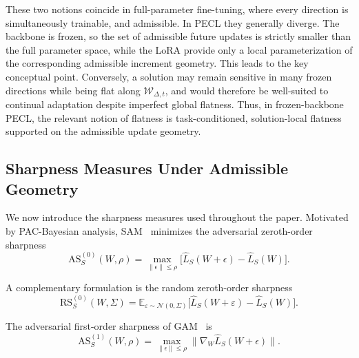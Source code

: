\documentclass[10pt]{article} %
\begin{document}
These two notions coincide in full-parameter fine-tuning, where every direction is simultaneously trainable, and admissible.
In PECL they generally diverge.
The backbone is frozen, so the set of admissible future updates is strictly smaller than the full parameter space, while the LoRA provide only a local parameterization of the corresponding admissible increment geometry.
This leads to the key conceptual point.
Conversely, a solution may remain sensitive in many frozen directions while being flat along $\mathcal{W}_{\Delta,t}$, and would therefore be well-suited to continual adaptation despite imperfect global flatness.
Thus, in frozen-backbone PECL, the relevant notion of flatness is task-conditioned, solution-local flatness supported on the admissible update geometry.

\subsection{Sharpness Measures Under Admissible Geometry}
\label{sec:sharpness-measures}

We now introduce the sharpness measures used throughout the paper.
Motivated by PAC-Bayesian analysis, SAM~\citep{foretSharpnessAwareMinimizationEfficiently2021} minimizes the adversarial zeroth-order sharpness
\[
\mathrm{AS}^{(0)}_S(W,\rho)
=
\max_{\|\epsilon\|\le \rho}
\bigl[\hat L_S(W+\epsilon)-\hat L_S(W)\bigr].
\]

A complementary formulation is the random zeroth-order sharpness
\[
\mathrm{RS}^{(0)}_S(W,\Sigma)
=
\mathbb{E}_{\varepsilon\sim\mathcal N(0,\Sigma)}
\bigl[\hat L_S(W+\varepsilon)-\hat L_S(W)\bigr].
\]

The adversarial first-order sharpness of GAM~\citep{Zhang_GAM} is
\[
\mathrm{AS}^{(1)}_S(W,\rho)
=
\max_{\|\epsilon\|\le \rho}
\|\nabla_W \hat L_S(W+\epsilon)\|.
\]

\end{document}
